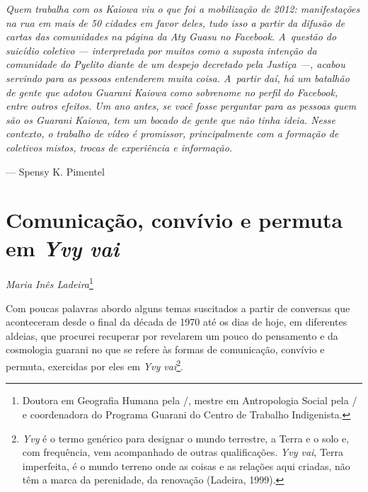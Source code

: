\clearpage

\vspace*{\fill}

\begin{flushleft}
\begin{minipage}[c]{0.85\textwidth}
\raggedright
\footnotesize
\emph{Quem trabalha com os Kaiowa viu o que foi a mobilização de 2012:
manifestações na rua em mais de 50 cidades em favor deles, tudo isso a
partir da difusão de cartas das comunidades na página da Aty Guasu no
Facebook. A~questão do suicídio coletivo --- interpretada por muitos como
a suposta intenção da comunidade do Pyelito diante de um despejo
decretado pela Justiça ---, acabou servindo para as pessoas entenderem
muita coisa. A~partir daí, há um batalhão de gente que adotou Guarani
Kaiowa como sobrenome no perfil do Facebook, entre outros efeitos. Um
ano antes, se você fosse perguntar para as pessoas quem são os Guarani
Kaiowa, tem um bocado de gente que não tinha ideia. Nesse contexto, o
trabalho de vídeo é promissor, principalmente com a formação de
coletivos mistos, trocas de experiência e informação.}

\smallskip
\hspace*{\fill}--- Spensy K. Pimentel
\end{minipage}
\end{flushleft}

\chapter{Comunicação, convívio e permuta em \emph{Yvy vai}}
\begin{flushright}
\emph{Maria Inês Ladeira}\footnote{Doutora em Geografia Humana pela
/, mestre em Antropologia Social pela / e coordenadora do
Programa Guarani do Centro de Trabalho Indigenista.}
\end{flushright}

\noindent Com poucas palavras abordo alguns temas suscitados a partir de conversas
que aconteceram desde o final da década de 1970 até os dias de hoje, em
diferentes aldeias, que procurei recuperar por revelarem um pouco do
pensamento e da cosmologia guarani no que se refere às formas de
comunicação, convívio e permuta, exercidas por eles em \emph{Yvy
vai}\footnote{\emph{Yvy} é o termo genérico para designar o mundo terrestre, a
Terra e o solo e, com frequência, vem acompanhado de outras
qualificações. \emph{Yvy vai}, Terra imperfeita, é o mundo terreno onde as
coisas e as relações aqui criadas, não têm a marca da perenidade, da
renovação (Ladeira, 1999).}. 

